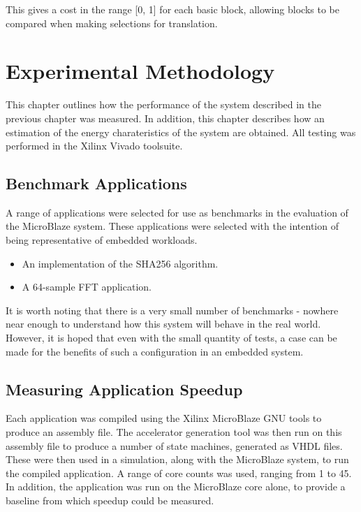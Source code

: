 \documentclass{UoYCSproject}
\begin{document}
This gives a cost in the range [0, 1] for each basic block, allowing blocks to be compared when making selections for translation.

\chapter{Experimental Methodology}

This chapter outlines how the performance of the system described in the previous chapter was measured.
In addition, this chapter describes how an estimation of the energy charateristics of the system are obtained.
All testing was performed in the Xilinx Vivado toolsuite.

\section{Benchmark Applications}

A range of applications were selected for use as benchmarks in the evaluation of the MicroBlaze system. These applications
were selected with the intention of being representative of embedded workloads.

\begin{itemize}
  \item An implementation of the SHA256 algorithm.
  \item A 64-sample FFT application.
\end{itemize}

It is worth noting that there is a very small number of benchmarks - nowhere near enough to understand how this system
will behave in the real world. However, it is hoped that even with the small quantity of tests, a case can be made for the
benefits of such a configuration in an embedded system.

\section{Measuring Application Speedup}

Each application was compiled using the Xilinx MicroBlaze GNU tools to produce an assembly file. The accelerator generation
tool was then run on this assembly file to produce a number of state machines, generated as VHDL files. These were then
used in a simulation, along with the MicroBlaze system, to run the compiled application. A range of core counts was used,
ranging from 1 to 45. In addition, the application was run on the MicroBlaze core alone, to provide a baseline from which speedup
could be measured.
\end{document}
